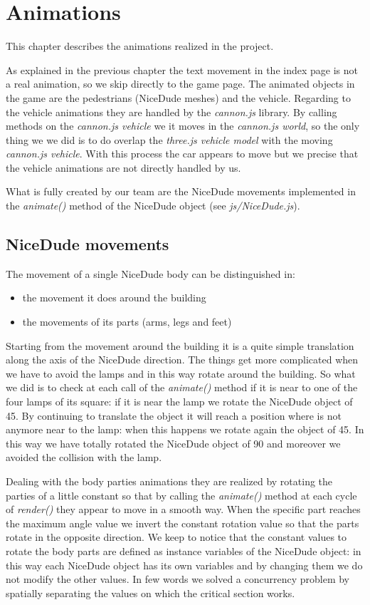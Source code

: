 \documentclass[a4paper, 11pt, titlepage]{report}
\begin{document}
\chapter{Animations}
	\par This chapter describes the animations realized in the project.
	\par As explained in the previous chapter the text movement in the index page is not a real animation, so we skip directly to the game page. The animated objects in the game are the pedestrians (NiceDude meshes) and the vehicle. Regarding to the vehicle animations they are handled by the \emph{cannon.js} library. By calling methods on the \emph{cannon.js vehicle} we it moves in the \emph{cannon.js world}, so the only thing we we did is to do overlap the \emph{three.js vehicle model} with the moving \emph{cannon.js vehicle}. With this process the car appears to move but we precise that the vehicle animations are not directly handled by us.
	\par What is fully created by our team are the NiceDude movements implemented in the \emph{animate()} method of the NiceDude object (see \emph{js/NiceDude.js}). 
	\section{NiceDude movements}
		\par The movement of a single NiceDude body can be distinguished in:
		\begin{itemize}
			\setlength\itemsep{0.25em}
			\item the movement it does around the building
			\item the movements of its parts (arms, legs and feet)
		\end{itemize}
		\par Starting from the movement around the building it is a quite simple translation along the axis of the NiceDude direction. The things get more complicated when we have to avoid the lamps and in this way rotate around the building. So what we did is to check at each call of the \emph{animate()} method if it is near to one of the four lamps of its square: if it is near the lamp we rotate the NiceDude object of 45\degree. By continuing to translate the object it will reach a position where is not anymore near to the lamp: when this happens we rotate again the object of 45\degree. In this way we have totally rotated the NiceDude object of 90 \degree and moreover we avoided the collision with the lamp.
		\par Dealing with the body parties animations they are realized by rotating the parties of a little constant so that by calling the \emph{animate()} method at each cycle of \emph{render()} they appear to move in a smooth way. When the specific part reaches the maximum angle value we invert the constant rotation value so that the parts rotate in the opposite direction. We keep to notice that the constant values to rotate the body parts are defined as instance variables of the NiceDude object: in this way each NiceDude object has its own variables and by changing them we do not modify the other values. In few words we solved a concurrency problem by spatially separating the values on which the critical section works.
\end{document}
